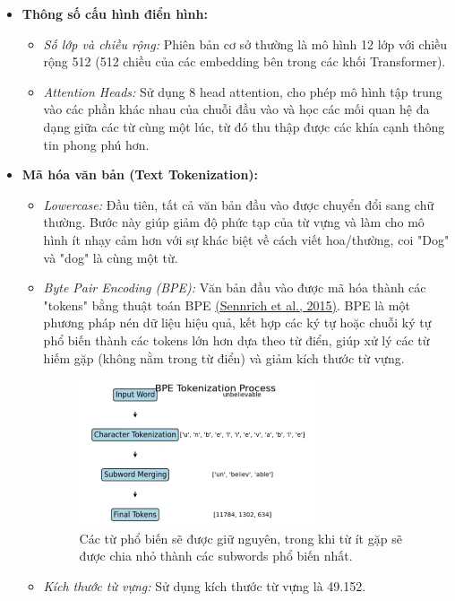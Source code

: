 \begin{itemize}
\item \textbf{Thông số cấu hình điển hình:}
\begin{itemize}
\item \textit{Số lớp và chiều rộng:} Phiên bản cơ sở thường là mô hình 12 lớp với chiều rộng 512 (512 chiều của các embedding bên trong các khối Transformer).
\item \textit{Attention Heads:} Sử dụng 8 head attention, cho phép mô hình tập trung vào các phần khác nhau của chuỗi đầu vào và học các mối quan hệ đa dạng giữa các từ cùng một lúc, từ đó thu thập được các khía cạnh thông tin phong phú hơn.
\end{itemize}
\item \textbf{Mã hóa văn bản (Text Tokenization):}
\begin{itemize}
\item \textit{Lowercase:} Đầu tiên, tất cả văn bản đầu vào được chuyển đổi sang chữ thường. Bước này giúp giảm độ phức tạp của từ vựng và làm cho mô hình ít nhạy cảm hơn với sự khác biệt về cách viết hoa/thường, coi "Dog" và "dog" là cùng một từ.
\item \textit{Byte Pair Encoding (BPE):} Văn bản đầu vào được mã hóa thành các "tokens" bằng thuật toán BPE \hyperref[bpe]{(Sennrich et al., 2015)}. BPE là một phương pháp nén dữ liệu hiệu quả, kết hợp các ký tự hoặc chuỗi ký tự phổ biến thành các tokens lớn hơn dựa theo từ điển, giúp xử lý các từ hiếm gặp (không nằm trong từ điển) và giảm kích thước từ vựng.
    \begin{figure}[H]
    \centering
        \includegraphics[width=0.7\textwidth]{img/03-bpe.png}
        \captionsetup{width=0.7\textwidth}
        \caption{Các từ phổ biến sẽ được giữ nguyên, trong khi từ ít gặp sẽ được chia nhỏ thành các subwords phổ biến nhất.}
        \label{fig:global_avg}
    \end{figure}
\item \textit{Kích thước từ vựng:} Sử dụng kích thước từ vựng là 49.152.

\end{itemize}
\end{itemize}
